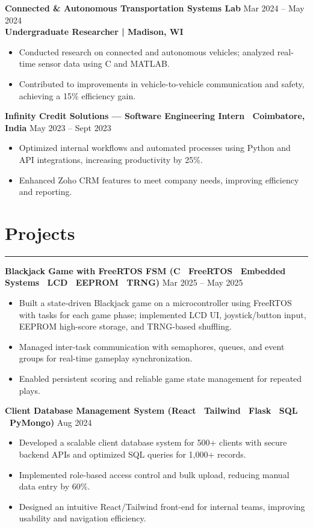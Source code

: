 \documentclass[a4paper]{article}
\newcommand{\sectionline}{%
  \par\vspace{0.2ex}%
  \noindent\rule{\linewidth}{0.25pt}%
  \par\vspace{0.2ex}%
}
\newcommand{\entryspace}{\vspace{0.35em}}
\begin{document}
\textbf{Connected \& Autonomous Transportation Systems Lab} \hfill Mar 2024 – May 2024\\
\textbf{Undergraduate Researcher | Madison, WI}
\begin{itemize}
    \item Conducted research on connected and autonomous vehicles; analyzed real-time sensor data using C and MATLAB.
    \item Contributed to improvements in vehicle-to-vehicle communication and safety, achieving a 15\% efficiency gain.
\end{itemize}
\entryspace

\textbf{Infinity Credit Solutions — Software Engineering Intern \textbar\ Coimbatore, India} \hfill May 2023 – Sept 2023
\begin{itemize}
    \item Optimized internal workflows and automated processes using Python and API integrations, increasing productivity by 25\%.
    \item Enhanced Zoho CRM features to meet company needs, improving efficiency and reporting.
\end{itemize}

\section*{Projects}
\sectionline

\textbf{Blackjack Game with FreeRTOS FSM (C \textbar\ FreeRTOS \textbar\ Embedded Systems \textbar\ LCD \textbar\ EEPROM \textbar\ TRNG)} \hfill Mar 2025 – May 2025
\begin{itemize}
    \item Built a state-driven Blackjack game on a microcontroller using FreeRTOS with tasks for each game phase; implemented LCD UI, joystick/button input, EEPROM high-score storage, and TRNG-based shuffling.
    \item Managed inter-task communication with semaphores, queues, and event groups for real-time gameplay synchronization.
    \item Enabled persistent scoring and reliable game state management for repeated plays.
\end{itemize}
\entryspace

\textbf{Client Database Management System (React \textbar\ Tailwind \textbar\ Flask \textbar\ SQL \textbar\ PyMongo)} \hfill Aug 2024
\begin{itemize}
    \item Developed a scalable client database system for 500+ clients with secure backend APIs and optimized SQL queries for 1,000+ records.
    \item Implemented role-based access control and bulk upload, reducing manual data entry by 60\%.
    \item Designed an intuitive React/Tailwind front-end for internal teams, improving usability and navigation efficiency.
\end{itemize}
\entryspace
\end{document}
